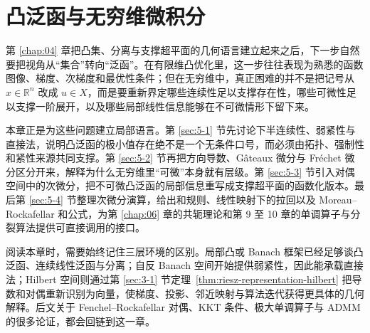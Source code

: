 \chapter{凸泛函与无穷维微积分}

\label{chap:05}

第 \ref{chap:04} 章把凸集、分离与支撑超平面的几何语言建立起来之后，下一步自然要把视角从“集合”转向“泛函”。在有限维凸优化里，这一步往往表现为熟悉的函数图像、梯度、次梯度和最优性条件；但在无穷维中，真正困难的并不是把记号从 $x\in\mathbb R^n$ 改成 $u\in X$，而是要重新界定哪些连续性足以支撑存在性，哪些可微性足以支撑一阶展开，以及哪些局部线性信息能够在不可微情形下留下来。

本章正是为这些问题建立局部语言。第 \ref{sec:5-1} 节先讨论下半连续性、弱紧性与直接法，说明凸泛函的极小值存在绝不是一个无条件口号，而必须由拓扑、强制性和紧性来源共同支撑。第 \ref{sec:5-2} 节再把方向导数、Gâteaux 微分与 Fréchet 微分区分开来，解释为什么无穷维里“可微”本身就有层级。第 \ref{sec:5-3} 节引入对偶空间中的次微分，把不可微凸泛函的局部信息重写成支撑超平面的函数化版本。最后第 \ref{sec:5-4} 节整理次微分演算，给出和规则、线性映射下的拉回以及 Moreau--Rockafellar 和公式，为第 \ref{chap:06} 章的共轭理论和第 9 至 10 章的单调算子与分裂算法提供可直接调用的接口。

阅读本章时，需要始终记住三层环境的区别。局部凸或 Banach 框架已经足够谈凸泛函、连续线性泛函与分离；自反 Banach 空间开始提供弱紧性，因此能承载直接法；Hilbert 空间则通过第 \ref{sec:3-1} 节定理~\ref{thm:riesz-representation-hilbert} 把导数和对偶重新识别为向量，使梯度、投影、邻近映射与算法迭代获得更具体的几何解释。后文关于 Fenchel--Rockafellar 对偶、KKT 条件、极大单调算子与 ADMM 的很多论证，都会回链到这一章。








